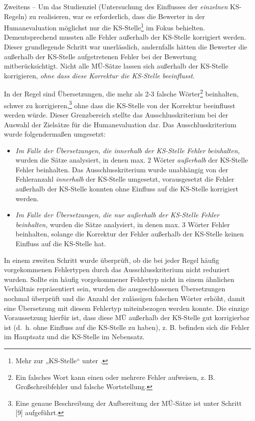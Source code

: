Zweitens -- Um das Studienziel (Untersuchung des Einflusses der \textit{einzelnen} KS-Regeln) zu realisieren, war es erforderlich, dass die Bewerter in der Humanevaluation möglichst nur die KS-Stelle\footnote{{Mehr zur „KS-Stelle“ unter .}} im Fokus behielten. Dementsprechend mussten alle Fehler außerhalb der KS-Stelle korrigiert werden. Dieser grundlegende Schritt war unerlässlich, andernfalls hätten die Bewerter die außerhalb der KS-Stelle aufgetretenen Fehler bei der Bewertung mitberücksichtigt. Nicht alle MÜ-Sätze lassen sich außerhalb der KS-Stelle korrigieren, \textit{ohne dass diese Korrektur die KS-Stelle beeinflusst}.

In der Regel sind Übersetzungen, die mehr als 2-3 falsche Wörter\footnote{{{{Ein falsches Wort kann einen oder mehrere Fehler aufweisen, z. B. Großschreibfehler und falsche Wortstellung.}}}} beinhalten, schwer zu korrigieren,\footnote{{{{Eine genaue Beschreibung der Aufbereitung der MÜ-Sätze ist unter Schritt [9] aufgeführt.}}}} ohne dass die KS-Stelle von der Korrektur beeinflusst werden würde. Dieser Grenzbereich stellte das Ausschlusskriterium bei der Auswahl der Zielsätze für die Humanevaluation dar. Das Ausschlusskriterium wurde folgendermaßen umgesetzt:

\begin{itemize}
\item \textit{Im Falle der Übersetzungen, die innerhalb der KS-Stelle Fehler beinhalten,} wurden die Sätze analysiert, in denen max. 2 Wörter \textit{außerhalb} der KS-Stelle Fehler beinhalten. Das Ausschlusskriterium wurde unabhängig von der Fehleranzahl \textit{innerhalb} der KS-Stelle umgesetzt, vorausgesetzt die Fehler außerhalb der KS-Stelle konnten ohne Einfluss auf die KS-Stelle korrigiert werden.
\item \textit{Im Falle der Übersetzungen, die nur außerhalb der KS-Stelle Fehler beinhalten,} wurden die Sätze analysiert, in denen max. 3 Wörter Fehler beinhalten, solange die Korrektur der Fehler außerhalb der KS-Stelle keinen Einfluss auf die KS-Stelle hat.
\end{itemize}

In einem zweiten Schritt wurde überprüft, ob die bei jeder Regel häufig vorgekommenen Fehlertypen durch das Ausschlusskriterium nicht reduziert wurden. Sollte ein häufig vorgekommener Fehlertyp nicht in einem ähnlichen Verhältnis repräsentiert sein, wurden die ausgeschlossenen Übersetzungen nochmal überprüft und die Anzahl der zulässigen falschen Wörter erhöht, damit eine Übersetzung mit diesem Fehlertyp miteinbezogen werden konnte. Die einzige Voraussetzung hierfür ist, dass diese MÜ außerhalb der KS-Stelle gut korrigierbar ist (d.~h. ohne Einfluss auf die KS-Stelle zu haben), z. B. befinden sich die Fehler im Hauptsatz und die KS-Stelle im Nebensatz.

